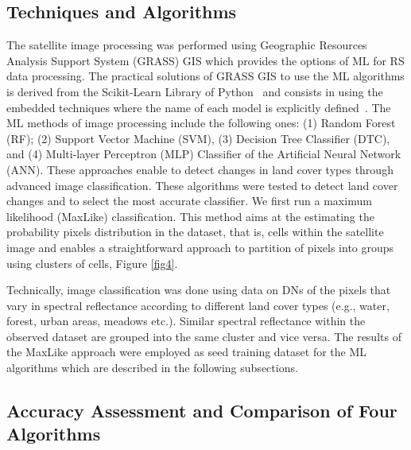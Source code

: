 \documentclass[jimaging,article,accept,pdftex,oneauthor]{Definitions/mdpi}
\begin{document}
\subsection{Techniques and Algorithms}

The satellite image processing was performed using Geographic Resources Analysis Support System (GRASS) GIS which provides the options of ML for RS data processing. The practical solutions of GRASS GIS to use the ML algorithms is derived from the Scikit-Learn Library of Python~\cite{scikitlearn} and consists in using the embedded techniques where the name of each model is explicitly defined~\cite{rs17050822,LEMENKOVA2025100180,geosciences15030104}. The ML methods of image processing include the following ones: (1) Random Forest (RF); (2) Support Vector Machine (SVM), (3) Decision Tree Classifier (DTC), and (4) %
 Multi-layer Perceptron (MLP) Classifier of the Artificial Neural Network (ANN). {These} approaches enable to detect changes in land cover types {through advanced image classification}. These algorithms were tested to detect land cover changes {and to select the most accurate classifier}. {We first run a maximum likelihood (MaxLike) classification. This method aims at the estimating the probability pixels distribution in the dataset, that is, cells within the satellite image and enables a straightforward approach to partition of pixels into groups using clusters of cells}, Figure \ref{fig4}. 

Technically, image classification was done using data on DNs of the pixels that {vary in spectral reflectance} according to different land cover types (e.g., water, forest, urban areas, meadows etc{.)}. Similar spectral reflectance within the observed dataset are grouped into the same cluster and vice versa. The results of the MaxLike approach were employed as seed training dataset for the ML algorithms which are described in the following subsections{. }


\subsection{Accuracy Assessment and Comparison of Four Algorithms}
\end{document}

